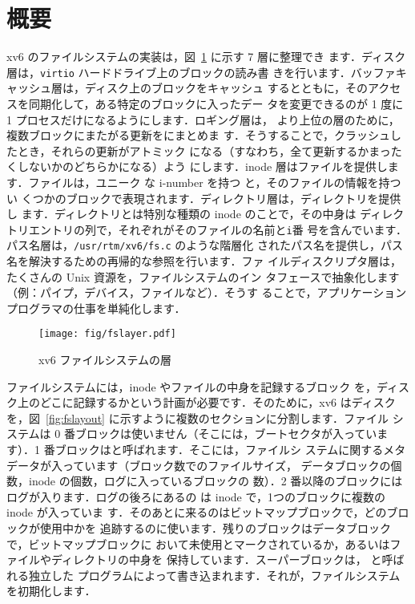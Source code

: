 \section{概要}

xv6 のファイルシステムの実装は，図~\ref{fig:fslayer} に示す 7 層に整理でき
ます．ディスク層は，\texttt{virtio} ハードドライブ上のブロックの読み書
きを行います．バッファキャッシュ層は，ディスク上のブロックをキャッシュ
するとともに，そのアクセスを同期化して，ある特定のブロックに入ったデー
タを変更できるのが 1 度に 1 プロセスだけになるようにします．ロギング層は，
より上位の層のために，複数ブロックにまたがる更新をにまとめま
す．そうすることで，クラッシュしたとき，それらの更新がアトミック
になる（すなわち，全て更新するかまったくしないかのどちらかになる）よう
にします．inode 層はファイルを提供します．ファイルは，ユニーク
な i-number を持つ  と，そのファイルの情報を持つい
くつかのブロックで表現されます．ディレクトリ層は，ディレクトリを提供し
ます．ディレクトリとは特別な種類の inode のことで，その中身は
ディレクトリエントリの列で，それぞれがそのファイルの名前と\texttt{i}番
号を含んでいます．パス名層は，\texttt{/usr/rtm/xv6/fs.c} のような階層化
されたパス名を提供し，パス名を解決するための再帰的な参照を行います．ファ
イルディスクリプタ層は，たくさんの Unix 資源を，ファイルシステムのイン
タフェースで抽象化します（例：パイプ，デバイス，ファイルなど）．そうす
ることで，アプリケーションプログラマの仕事を単純化します．


\begin{figure}[t]
\center
\texttt{[image: fig/fslayer.pdf]}
\caption{xv6 ファイルシステムの層}
\label{fig:fslayer}
\end{figure}

ファイルシステムには，inode やファイルの中身を記録するブロック
を，ディスク上のどこに記録するかという計画が必要です．そのために，xv6
はディスクを，図~\ref{fig:fslayout} に示すように複数のセクションに分割します．ファイル
システムは 0 番ブロックは使いません（そこには，ブートセクタが入っていま
す）．1 番ブロックはと呼ばれます．そこには，ファイルシ
ステムに関するメタデータが入っています（ブロック数でのファイルサイズ，
データブロックの個数，inode の個数，ログに入っているブロックの
数）．2 番以降のブロックにはログが入ります．ログの後ろにあるの
は inode で，1つのブロックに複数の inode が入っていま
す．そのあとに来るのはビットマップブロックで，どのブロックが使用中かを
追跡するのに使います．残りのブロックはデータブロックで，ビットマップブロックに
おいて未使用とマークされているか，あるいはファイルやディレクトリの中身を
保持しています．スーパーブロックは， と呼ばれる独立した
プログラムによって書き込まれます．それが，ファイルシステムを初期化します．

